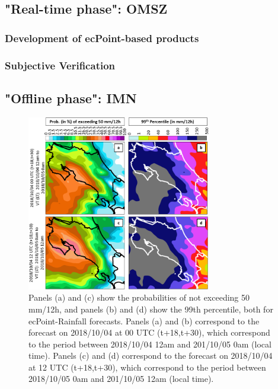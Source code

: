 \subsection{"Real-time phase": OMSZ}
\subsubsection{Development of ecPoint-based products}
\subsubsection{Subjective Verification}


\subsection{"Offline phase": IMN}

\begin{figure}
\centerline{\includegraphics[width=19pc]{manuscript/Figures/Results_CaseStudy_Comparison_Prob_Perc.png}}
\caption{Panels (a) and (c) show the probabilities of not exceeding 50 mm/12h, and panels (b) and (d) show the 99th percentile, both for ecPoint-Rainfall forecasts. Panels (a) and (b) correspond to the forecast on 2018/10/04 at 00 UTC (t+18,t+30), which correspond to the period between 2018/10/04 12am and 201/10/05 0am (local time). Panels (c) and (d) correspond to the forecast on 2018/10/04 at 12 UTC (t+18,t+30), which correspond to the period between 2018/10/05 0am and 201/10/05 12am (local time).} 
\label{CaseStudy_Comparison_Prob_Perc}
\end{figure}

